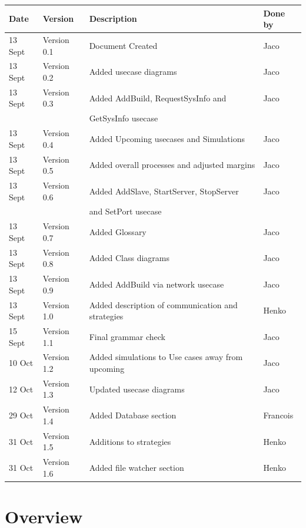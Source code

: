 \documentclass[a4paper,12pt,final]{article}
\begin{document}
\begin{tabular}{|l|l|l|l|}
\hline
\textbf{Date} & \textbf{Version} & \textbf{Description} & \textbf{Done by}\\
\hline
13 Sept & Version 0.1 & Document Created & Jaco\\
\hline
13 Sept & Version 0.2 & Added usecase diagrams & Jaco\\
\hline
13 Sept & Version 0.3 & Added AddBuild, RequestSysInfo and  & Jaco\\
&&GetSysInfo usecase&\\
\hline
13 Sept & Version 0.4 & Added Upcoming usecases and Simulations & Jaco\\
\hline
13 Sept & Version 0.5 & Added overall processes and adjusted margins & Jaco\\
\hline
13 Sept & Version 0.6 & Added AddSlave, StartServer, StopServer  & Jaco\\
&&and SetPort usecase&\\
\hline
13 Sept & Version 0.7 & Added Glossary & Jaco\\
\hline
13 Sept & Version 0.8 & Added Class diagrams & Jaco\\
\hline
13 Sept & Version 0.9 & Added AddBuild via network usecase & Jaco\\
\hline
13 Sept & Version 1.0 & Added description of communication and strategies & Henko\\
\hline
15 Sept & Version 1.1 & Final grammar check & Jaco\\
\hline
10 Oct & Version 1.2 & Added simulations to Use cases away from upcoming & Jaco\\
\hline
12 Oct & Version 1.3 & Updated usecase diagrams & Jaco\\
\hline
29 Oct & Version 1.4 & Added Database section & Francois\\
\hline
31 Oct & Version 1.5 & Additions to strategies & Henko\\
\hline
31 Oct & Version 1.6 & Added file watcher section & Henko\\
\hline
\end{tabular}
\newpage
\tableofcontents
\thispagestyle{empty}
\newpage

\section{Overview}
\end{document}
